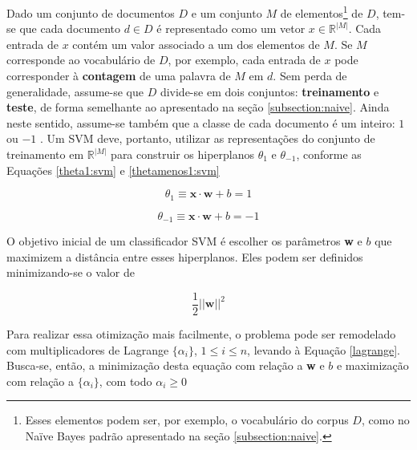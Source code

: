 Dado um conjunto de documentos \ensuremath{D} e um conjunto \ensuremath{M} de elementos\footnote{Esses elementos podem ser, por exemplo, o vocabulário do corpus \ensuremath{D}, como no Naïve Bayes padrão apresentado na seção \ref{subsection:naive}.} de \ensuremath{D}, tem-se que cada documento \ensuremath{d \in D} é representado como um vetor \ensuremath{x \in \mathbb{R}^{|M|}}. Cada entrada de \ensuremath{x} contém um valor associado a um dos elementos de \ensuremath{M}. Se \ensuremath{M} corresponde ao vocabulário de \ensuremath{D}, por exemplo, cada entrada de \ensuremath{x} pode corresponder à \textbf{contagem} de uma palavra de \ensuremath{M} em \ensuremath{d}. Sem perda de generalidade, assume-se que \ensuremath{D} divide-se em dois conjuntos: \textbf{treinamento} e \textbf{teste}, de forma semelhante ao apresentado na seção \ref{subsection:naive}. Ainda neste sentido, assume-se também que a classe de cada documento é um inteiro: \ensuremath{1} ou \ensuremath{-1} \cite{mono-puc}. Um SVM deve, portanto, utilizar as representações do conjunto de treinamento em \ensuremath{\mathbb{R}^{|M|}} para construir os hiperplanos \ensuremath{\theta_1} e \ensuremath{\theta_{-1}}, conforme as Equações \ref{theta1:svm} e \ref{thetamenos1:svm} \cite{mono-puc}

\begin{equation}
\label{theta1:svm}
\ensuremath{\theta_1 \equiv } \textbf{x} \ensuremath{\cdot} \textbf{w} + \ensuremath{b} = 1
\end{equation}

\begin{equation}
\label{thetamenos1:svm}
\ensuremath{\theta_{-1} \equiv } \textbf{x} \ensuremath{\cdot} \textbf{w} + \ensuremath{b} = -1
\end{equation}

O objetivo inicial de um classificador SVM é escolher os parâmetros \textbf{w} e \ensuremath{b} que maximizem a distância entre esses hiperplanos. Eles podem ser definidos minimizando-se o valor de \cite{mono-puc}


\begin{equation}
\label{optim:svm}
\ensuremath{\frac{1}{2}||}\textbf{w}\ensuremath{||^2}
\end{equation}

Para realizar essa otimização mais facilmente, o problema pode ser remodelado com multiplicadores de Lagrange \ensuremath{\{\alpha_i\}}, \ensuremath{1 \leq i \leq n}, levando à Equação \ref{lagrange}. Busca-se, então, a minimização desta equação com relação a \textbf{w} e \ensuremath{b} e maximização com relação a \ensuremath{\{\alpha_i\}}, com todo \ensuremath{\alpha_i \geq 0} \cite{mono-puc}

